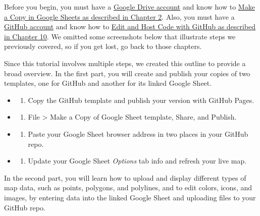 \documentclass[
  english,
]{book}
\providecommand{\tightlist}{%
  \setlength{\itemsep}{0pt}\setlength{\parskip}{0pt}}
\begin{document}
Before you begin, you must have a \href{https://drive.google.com}{Google Drive account} and know how to \href{copy.html}{Make a Copy in Google Sheets as described in Chapter 2}. Also, you must have a \href{https://github.com}{GitHub account} and know how to \href{github.html}{Edit and Host Code with GitHub as described in Chapter 10}. We omitted some screenshots below that illustrate steps we previously covered, so if you get lost, go back to those chapters.

Since this tutorial involves multiple steps, we created this outline to provide a broad overview. In the first part, you will create and publish your copies of two templates, one for GitHub and another for its linked Google Sheet.

\begin{itemize}
\item
  \begin{enumerate}
  \def\labelenumi{\Alph{enumi})}
  \tightlist
  \item
    Copy the GitHub template and publish your version with GitHub Pages.
  \end{enumerate}
\item
  \begin{enumerate}
  \def\labelenumi{\Alph{enumi})}
  \setcounter{enumi}{1}
  \tightlist
  \item
    File \textgreater{} Make a Copy of Google Sheet template, Share, and Publish.
  \end{enumerate}
\item
  \begin{enumerate}
  \def\labelenumi{\Alph{enumi})}
  \setcounter{enumi}{2}
  \tightlist
  \item
    Paste your Google Sheet browser address in two places in your GitHub repo.
  \end{enumerate}
\item
  \begin{enumerate}
  \def\labelenumi{\Alph{enumi})}
  \setcounter{enumi}{3}
  \tightlist
  \item
    Update your Google Sheet \emph{Options} tab info and refresh your live map.
  \end{enumerate}
\end{itemize}

In the second part, you will learn how to upload and display different types of map data, such as points, polygons, and polylines, and to edit colors, icons, and images, by entering data into the linked Google Sheet and uploading files to your GitHub repo.
\end{document}
